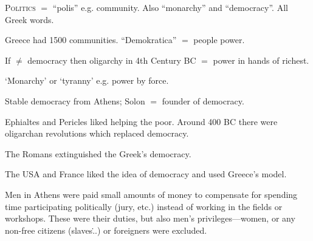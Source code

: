 \documentclass[a4paper,12pt]{article}
\begin{document}
\textsc{Politics} $=$ ``polis'' e.g. community.  Also ``monarchy'' and ``democracy''.  All Greek words.

Greece had 1500 communities.  ``Demokratica'' $=$ people power.

If $\not=$ democracy then oligarchy in 4th Century \textsc{BC} $=$ power in hands of richest.

`Monarchy' or `tyranny' e.g. power by force.

Stable democracy from Athens; Solon $=$ founder of democracy.

Ephialtes and Pericles liked helping the poor.  Around 400 \textsc{BC} there were oligarchan revolutions which replaced democracy.

The Romans extinguished the Greek's democracy.

The USA and France liked the idea of democracy and used Greece's model.

Men in Athens were paid small amounts of money to compensate for spending time participating politically (jury, etc.) instead of working in the fields or workshops.  These were their duties, but also men's privileges---women, or any non-free citizens (slaves\...) or foreigners were excluded.
\end{document}
